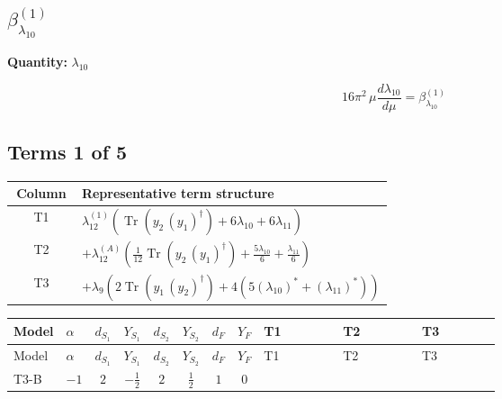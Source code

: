 \documentclass[8pt]{article}
\begin{document}
\begin{landscape}
\section*{$\beta_{\lambda_{10}}^{(1)}$}
\noindent\textbf{Quantity: }$\lambda_{10}$\par\smallskip
\[16\pi^2\,\mu\frac{d \lambda_{10}}{d\mu}=\beta_{\lambda_{10}}^{(1)}\]
\subsection*{Terms 1 of 5}
\begin{center}
\begin{tabular}{@{}c >{\raggedright\arraybackslash}p{0.82\linewidth}@{}}
\toprule
Column & Representative term structure \\
\midrule
T1 & \(\displaystyle {\lambda_{12}^{(1)}} (\operatorname{Tr}\!\left({y_2}\,\left({y_1}\right)^{\dagger}\right)+6 {\lambda_{10}}+6 {\lambda_{11}})\) \\
\midrule
T2 & \(\displaystyle +{\lambda_{12}^{(A)}} \left(\frac{1}{12} \operatorname{Tr}\!\left({y_2}\,\left({y_1}\right)^{\dagger}\right)+\frac{5 {\lambda_{10}}}{6}+\frac{{\lambda_{11}}}{6}\right)\) \\
\midrule
T3 & \(\displaystyle +{\lambda_9} (2 \operatorname{Tr}\!\left({y_1}\,\left({y_2}\right)^{\dagger}\right)+4 (5 \left({\lambda_{10}}\right)^{*}+\left({\lambda_{11}}\right)^{*}))\) \\
\midrule
\bottomrule
\end{tabular}
\end{center}
\smallskip
\tiny
\begin{longtable}{@{}llcccccc >{\raggedright\arraybackslash}p{0.21\linewidth} >{\raggedright\arraybackslash}p{0.21\linewidth} >{\raggedright\arraybackslash}p{0.21\linewidth}@{}}
\toprule
Model & $\alpha$ & $d_{S_1}$ & $Y_{S_1}$ & $d_{S_2}$ & $Y_{S_2}$ & $d_F$ & $Y_F$ & T1 & T2 & T3 \\
\midrule
\endfirsthead
\toprule
Model & $\alpha$ & $d_{S_1}$ & $Y_{S_1}$ & $d_{S_2}$ & $Y_{S_2}$ & $d_F$ & $Y_F$ & T1 & T2 & T3 \\
\midrule
\endhead
T3-B & $-1$ & $2$ & $-\frac{1}{2}$ & $2$ & $\frac{1}{2}$ & $1$ & $0$ & \scriptsize\adjustbox{max width=\linewidth}{$\begin{gathered} {\lambda_{12}^{(1)}} (\operatorname{Tr}\!\left({y_2}\,\left({y_1}\right)^{\dagger}\right)+6 {\lambda_{10}}+6 {\lambda_{11}})\end{gathered}$} & \scriptsize\adjustbox{max width=\linewidth}{$\begin{gathered} +{\lambda_{12}^{(A)}} \left(\frac{1}{12} \operatorname{Tr}\!\left({y_2}\,\left({y_1}\right)^{\dagger}\right)+\frac{5 {\lambda_{10}}}{6}+\frac{{\lambda_{11}}}{6}\right)\end{gathered}$} & \scriptsize\adjustbox{max width=\linewidth}{$\begin{gathered} +{\lambda_9} (2 \operatorname{Tr}\!\left({y_1}\,\left({y_2}\right)^{\dagger}\right)+4 (5 \left({\lambda_{10}}\right)^{*}+\left({\lambda_{11}}\right)^{*}))\end{gathered}$} \\

\end{longtable}
\end{landscape}
\end{document}
